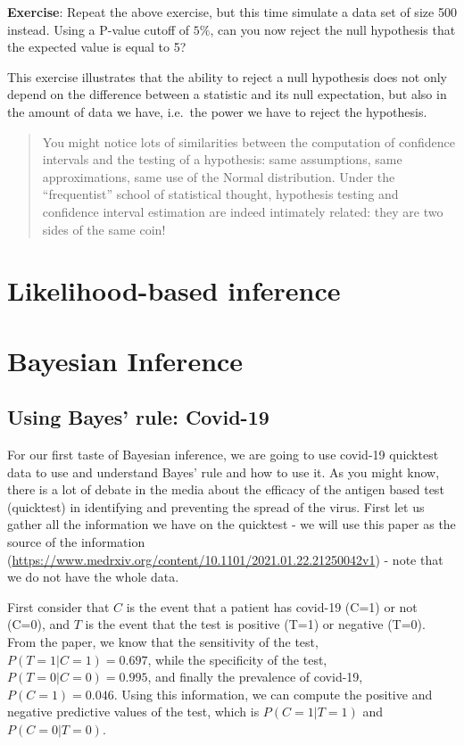 \documentclass[
]{book}
\begin{document}
\textbf{Exercise}: Repeat the above exercise, but this time simulate a data set of size 500 instead. Using a P-value cutoff of \(5\%\), can you now reject the null hypothesis that the expected value is equal to 5?

This exercise illustrates that the ability to reject a null hypothesis does not only depend on the difference between a statistic and its null expectation, but also in the amount of data we have, i.e.~the power we have to reject the hypothesis.

\begin{quote}
You might notice lots of similarities between the computation of confidence intervals and the testing of a hypothesis: same assumptions, same approximations, same use of the Normal distribution. Under the ``frequentist'' school of statistical thought, hypothesis testing and confidence interval estimation are indeed intimately related: they are two sides of the same coin!
\end{quote}

\hypertarget{likelihood-based-inference}{%
\chapter{Likelihood-based inference}\label{likelihood-based-inference}}

\hypertarget{bayesian-inference}{%
\chapter{Bayesian Inference}\label{bayesian-inference}}

\hypertarget{using-bayes-rule-covid-19}{%
\section{Using Bayes' rule: Covid-19}\label{using-bayes-rule-covid-19}}

For our first taste of Bayesian inference, we are going to use covid-19 quicktest data to use and understand Bayes' rule and how to use it. As you might know, there is a lot of debate in the media about the efficacy of the antigen based test (quicktest) in identifying and preventing the spread of the virus. First let us gather all the information we have on the quicktest - we will use this paper as the source of the information (\url{https://www.medrxiv.org/content/10.1101/2021.01.22.21250042v1}) - note that we do not have the whole data.

First consider that \(C\) is the event that a patient has covid-19 (C=1) or not (C=0), and \(T\) is the event that the test is positive (T=1) or negative (T=0).
From the paper, we know that the sensitivity of the test, \(P(T=1 | C=1) = 0.697\), while the specificity of the test, \(P(T=0 | C=0) = 0.995\), and finally the prevalence of covid-19, \(P(C=1) = 0.046\). Using this information, we can compute the positive and negative predictive values of the test, which is \(P(C=1 | T=1)\) and \(P(C=0 | T=0)\).
\end{document}
